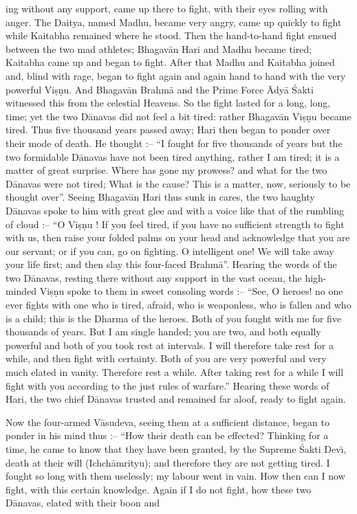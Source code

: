ing without any support, came up there to fight, with their eyes rolling with anger. The Daitya, named Madhu, became very angry, came up quickly to fight while Kaitabha remained where he stood. Then the hand-to-hand fight ensued between the two mad athletes; Bhagav\=an Hari and Madhu became tired; Kaitabha came up and began to fight. After that Madhu and Kaitabha joined and, blind with rage, began to fight again and again hand to hand with the very powerful Vi\d{s}\d{n}u. And Bhagav\=an Brahm\=a and the Prime Force \=Ady\=a \'Sakti witnessed this from the celestial Heavens. So the fight lasted for a long, long, time; yet the two D\=anavas did not feel a bit tired: rather Bhagav\=an Vi\d{s}\d{n}u became tired. Thus five thousand years passed away; Hari then began to ponder over their mode of death. He thought :-- ``I fought for five thousands of years but the two formidable D\=anavas have not been tired anything, rather I am tired; it is a matter of great surprise. Where has gone my prowess? and what for the two D\=anavas were not tired; What is the cause? This is a matter, now, seriously to be thought over''. Seeing Bhagav\=an Hari thus sunk in cares, the two haughty D\=anavas spoke to him with great glee and with a voice like that of the rumbling of cloud :-- ``O Vi\d{s}\d{n}u ! If you feel tired, if you have no sufficient strength to fight with us, then raise your folded palms on your head and acknowledge that you are our servant; or if you can, go on fighting. O intelligent one!
We will take away your life first; and then slay this four-faced Brahm\=a''. Hearing the words of the two D\=anavas, resting there without any support in the vast ocean, the high-minded Vi\d{s}\d{n}u spoke to them in sweet consoling words :-- ``See, O heroes! no one ever fights with one who is tired, afraid, who is weaponless, who is fallen and who is a child; this is the Dharma of the heroes. Both of you fought with me for five thousands of years. But I am single handed; you are two, and both equally powerful and both of you took rest at intervals. I will therefore take rest for a while, and then fight with certainty. Both of you are very powerful and very much elated in vanity. Therefore rest a while. After taking rest for a while I will fight with you according to the just rules of warfare.'' Hearing these words of Hari, the two chief D\=anavas trusted and remained far aloof, ready to fight again.

Now the four-armed V\=asudeva, seeing them at a sufficient distance, began to ponder in his mind thus :-- ``How their death can be effected? Thinking for a time, he came to know that they have been granted, by the Supreme \'Sakti Dev\={\i}, death at their will (Ichch\=amrityu); and therefore they are not getting tired. I fought so long with them uselessly; my labour went in vain. How then can I now fight, with this certain knowledge. Again if I do not fight, how these two D\=anavas, elated with their boon and

